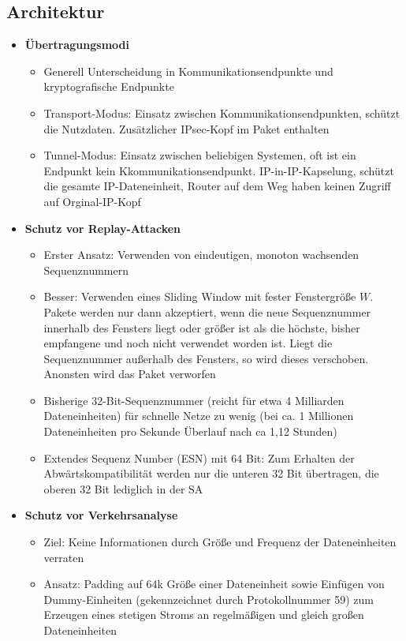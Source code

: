 \subsection{Architektur}
\begin{itemize}
	\item \textbf{Übertragungsmodi}
	\begin{itemize}
		\item Generell Unterscheidung in Kommunikationsendpunkte und kryptografische Endpunkte
		\item Transport-Modus: Einsatz zwischen Kommunikationsendpunkten, schützt die Nutzdaten. Zusätzlicher IPsec-Kopf im Paket enthalten
		\item Tunnel-Modus: Einsatz zwischen beliebigen Systemen, oft ist ein Endpunkt kein Kkommunikationsendpunkt. IP-in-IP-Kapselung, schützt die gesamte IP-Dateneinheit, Router auf dem Weg haben keinen Zugriff auf Orginal-IP-Kopf
	\end{itemize}
	\item \textbf{Schutz vor Replay-Attacken}
	\begin{itemize}
		\item Erster Ansatz: Verwenden von eindeutigen, monoton wachsenden Sequenznummern
		\item Besser: Verwenden eines Sliding Window mit fester Fenstergröße \(W\). Pakete werden nur dann akzeptiert, wenn die neue Sequenznummer innerhalb des Fensters liegt oder größer ist als die höchste, bisher empfangene und noch nicht verwendet worden ist. Liegt die Sequenznummer außerhalb des Fensters, so wird dieses verschoben. Anonsten wird das Paket verworfen
		\item Bisherige 32-Bit-Sequenznummer (reicht für etwa 4 Milliarden Dateneinheiten) für schnelle Netze zu wenig (bei ca. 1 Millionen Dateneinheiten pro Sekunde Überlauf nach ca 1,12 Stunden)
		\item Extendes Sequenz Number (ESN) mit 64 Bit: Zum Erhalten der Abwärtskompatibilität werden nur die unteren 32 Bit übertragen, die oberen 32 Bit lediglich in der SA 
	\end{itemize}
	\item \textbf{Schutz vor Verkehrsanalyse}
	\begin{itemize}
		\item Ziel: Keine Informationen durch Größe und Frequenz der Dateneinheiten verraten
		\item Ansatz: Padding auf 64k Größe einer Dateneinheit sowie Einfügen von Dummy-Einheiten (gekennzeichnet durch Protokollnummer 59) zum Erzeugen eines stetigen Stroms an regelmäßigen und gleich großen Dateneinheiten
	\end{itemize}
\end{itemize}


